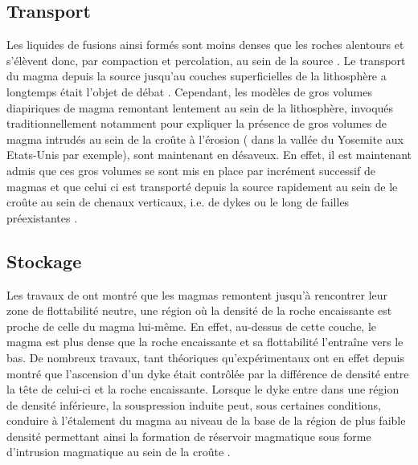 \subsection{Transport}
\label{C1-sec:transport}

Les liquides de fusions ainsi formés  sont moins denses que les roches
alentours et s'élèvent donc, par compaction et percolation, au sein de
la  source  \citep{McKenzy:1984bo,McKenzie:1985jq}.  Le  transport  du
magma  depuis   la  source  jusqu'au  couches   superficielles  de  la
lithosphère     a     longtemps     était     l'objet     de     débat
\citep{Clemens:1992kr,Miller:1999km}.  Cependant, les  modèles de gros
volumes  diapiriques  de  magma  remontant lentement  au  sein  de  la
lithosphère, invoqués  traditionnellement notamment pour  expliquer la
présence de  gros volumes  de magma  intrudés au sein  de la  croûte à
l'érosion (  dans la vallée  du Yosemite aux Etats-Unis  par exemple),
sont maintenant  en désaveux.  En  effet, il est maintenant  admis que
ces  gros volumes  se sont  mis en  place par  incrément successif  de
magmas et que  celui ci est transporté depuis la  source rapidement au
sein de le croûte  au sein de chenaux verticaux, i.e.   de dykes ou le
long               de              failles               préexistantes
\citep{Clemens:1992kr,Petford:1993bk,Rubin:1995upa,Glazner:2004gv}.

\subsection{Stockage}
\label{C1-sec:stockage}

Les  travaux  de  \citet{Walker:1989jq}  ont  montré  que  les  magmas
remontent  jusqu'à rencontrer  leur zone  de flottabilité  neutre, une
région où  la densité de la  roche encaissante est proche  de celle du
magma lui-même. En effet, au-dessus de cette couche, le magma est plus
dense que la  roche encaissante et sa flottabilité  l'entraîne vers le
bas.        De      nombreux       travaux,      tant       théoriques
\citep{Lister:1991ut,Petford:1993bk,Rubin:1995upa}    qu'expérimentaux
\citep{Taisne:2009kj,Taisne:2011do}  ont en  effet  depuis montré  que
l'ascension d'un  dyke était  contrôlée par  la différence  de densité
entre la  tête de celui-ci  et la  roche encaissante. Lorsque  le dyke
entre dans une  région de densité inférieure,  la souspression induite
peut, sous  certaines conditions, conduire  à l'étalement du  magma au
niveau de la base de la région de plus faible densité permettant ainsi
la formation de réservoir magmatique sous forme d'intrusion magmatique
au sein de la croûte \citep{Taisne:2011do}.

